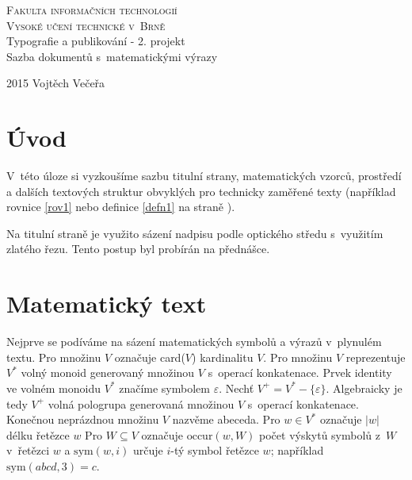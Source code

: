 \documentclass[11pt,a4paper,twocolumn]{article}
\theoremstyle{definition}
\theoremstyle{lemma}
\begin{document}
\begin{titlepage}
  \begin{center}

    \textsc{\Huge Fakulta informačních technologií\\Vysoké učení technické v~Brně}\\
    \LARGE Typografie a publikování - 2. projekt\\Sazba dokumentů
s~matematickými výrazy\\
  \end{center}
  {\Large 2015 \hfill Vojtěch Večeřa}
\end{titlepage}

\section*{Úvod}
\label{uvod}
\noindent V~této úloze si vyzkoušíme sazbu titulní strany, matematických vzorců, prostředí a
dalších textových struktur obvyklých pro technicky zaměřené texty (například rovnice \ref{rov1}
nebo definice \ref{defn1} na straně \pageref{defn1}).

\indent Na titulní straně je využito sázení nadpisu podle optického středu s~využitím zlatého řezu. Tento postup byl probírán na přednášce.

\section{Matematický text}
\label{mattext}
\noindent Nejprve se podíváme na sázení matematických symbolů a výrazů v~plynulém textu. Pro
množinu $V$ označuje card($V$) kardinalitu $V$. Pro množinu $V$ reprezentuje $V^*$ volný monoid
generovaný množinou $V$ s~operací konkatenace.
Prvek identity ve volném monoidu $V^*$ značíme symbolem $\varepsilon$.
Nechť $V^+ =V^*-\{\varepsilon\}$. Algebraicky je tedy $V^+$ volná pologrupa generovaná množinou
$V$ s~operací konkatenace. Konečnou neprázdnou množinu $V$ nazvěme abeceda.
Pro $w \in V^*$ označuje $|w|$ délku řetězce $w$ Pro $W \subseteq V$ označuje $\mathrm{occur}(w,
W)$ počet výskytů symbolů z~$W$ v~řetězci $w$ a $\mathrm{sym}(w, i)$ určuje $i$-tý symbol řetězce
$w$; například $\mathrm{sym}(abcd, 3) = c$.
\end{document}

